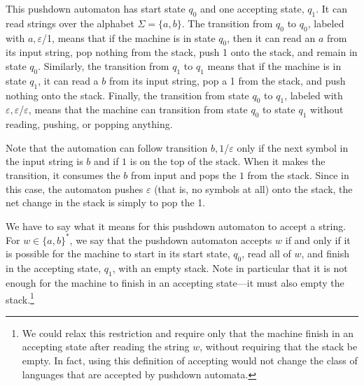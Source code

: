 \medskip
\centerline{}
\smallskip

This pushdown automaton has start state $q_0$ and one accepting
state, $q_1$.  It can read strings over the alphabet $\Sigma=\{a,b\}$.
The transition from $q_0$ to $q_0$, labeled with $a,\varepsilon$/1,
means that if the machine is in state $q_0$, then it can read an
$a$ from its input string, pop nothing from the stack, push 1 onto
the stack, and remain in state $q_0$.  Similarly, the transition
from $q_1$ to $q_1$ means that if the machine is in state $q_1$,
it can read a $b$ from its input string, pop a 1 from the stack,
and push nothing onto the stack.  Finally, the transition
from state $q_0$ to $q_1$, labeled with $\varepsilon,\varepsilon$/$\varepsilon$,
means that the machine can transition from state $q_0$ to state $q_1$
without reading, pushing, or popping anything.

Note that the automation can follow transition $b,1$/$\varepsilon$ only
if the next symbol in the input string is $b$ and if $1$ is on the 
top of the stack.  When it makes the transition, it consumes the $b$ from
input and pops the $1$ from the stack.  Since in this case, the automaton
pushes $\varepsilon$ (that is, no symbols at all) onto the stack, the net
change in the stack is simply to pop the 1.

We have to say what it means for this pushdown automaton to accept
a string.  For $w\in\{a,b\}^*$, we say that the pushdown automaton
accepts $w$ if and only if it is possible for the machine to start
in its start state, $q_0$, read all of $w$, and finish in the
accepting state, $q_1$, with an empty stack.  Note in particular that
it is not enough for the machine to finish in an accepting state---it
must also empty the stack.\footnote{We could relax this restriction
and require only that the machine finish in an accepting state after
reading the string $w$, without requiring that the stack be empty.
In fact, using this definition of accepting would not change the
class of languages that are accepted by pushdown automata.}

